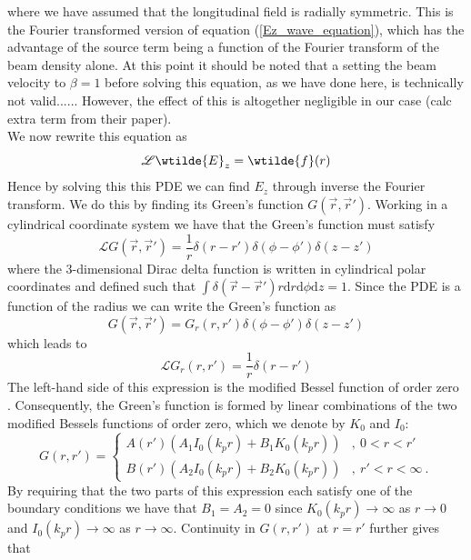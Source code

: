 where we have assumed that the longitudinal field is radially symmetric. This is the Fourier transformed version of equation (\ref{Ez_wave_equation}), which has the advantage of the source term being a function of the Fourier transform of the beam density alone. At this point it should be noted that a setting the beam velocity to $\beta=1$ before solving this equation, as we have done here, is technically not valid...... However, the effect of this is altogether negligible in our case (calc extra term from their paper).\\
We now rewrite this equation as
\begin{equation}
\mathscr{L}\wtilde{E}_z= \wtilde{f}(r)
\end{equation}
Hence by solving this this PDE we can find $E_z$ through inverse the Fourier transform. We do this by finding its Green's function $G(\vec{r},\vec{r}')$. Working in a cylindrical coordinate system we have that the Green's function must satisfy 
\begin{equation}
\mathscr{L}G(\vec{r},\vec{r}')=\frac{1}{r}\delta(r-r')\delta(\phi-\phi')\delta(z-z')
\end{equation}
where the 3-dimensional Dirac delta function is written in cylindrical polar coordinates and defined such that $\int\delta(\vec{r}-\vec{r}')r\mathrm{d}r\mathrm{d}\phi\mathrm{d}z=1$. Since the PDE is a function of the radius we can write the Green's function as
\begin{equation}
G(\vec{r},\vec{r}')=G_r(r,r')\delta(\phi-\phi')\delta(z-z')
\end{equation}
which leads to 
\begin{equation}
\mathscr{L}G_r(r,r')=\frac{1}{r}\delta(r-r')
\label{greens_diff_eq}
\end{equation}
The left-hand side of this expression is the modified Bessel function of order zero \cite{Jackson1962}. Consequently, the Green's function is formed by linear combinations of the two modified Bessels functions of order zero, which we denote by $K_0$ and $I_0$: %
\begin{equation}
G\left(r,r'\right)=\left\{ \begin{array}{ll}
A(r')(A_1 I_0(k_pr)+B_1K_0(k_pr)) &,~ 0<r<r'\\
B(r')(A_2 I_0(k_pr)+B_2K_0(k_pr))  &,~ r'<r<\infty~.
\end{array}\right.
\end{equation}
By requiring that the two parts of this expression each satisfy one of the boundary conditions we have that $B_1=A_2=0$ since $K_0(k_pr)\to \infty$ as $r\to 0$ and $I_0(k_pr)\to \infty$ as $r\to \infty$. Continuity in $G(r,r')$ at $r=r'$ further gives that 
